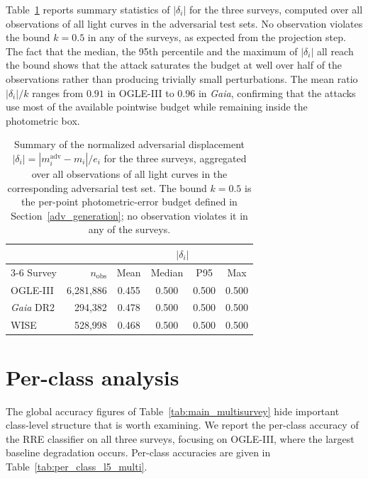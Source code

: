 \documentclass{aa}
\begin{document}
Table~\ref{tab:perturbation_summary} reports summary statistics of
$|\delta_i|$ for the three surveys, computed over all observations of all
light curves in the adversarial test sets. No observation violates the bound
$k = 0.5$ in any of the surveys, as expected from the projection step. The
fact that the median, the 95th percentile and the maximum of $|\delta_i|$
all reach the bound shows that the attack saturates the budget at well over
half of the observations rather than producing trivially small
perturbations. The mean ratio $|\delta_i|/k$ ranges from $0.91$ in
OGLE-III to $0.96$ in \textit{Gaia}, confirming that the attacks use most of
the available pointwise budget while remaining inside the photometric box.

\begin{table}[htbp]
\centering
\caption{Summary of the normalized adversarial displacement
$|\delta_i| = |m^{\mathrm{adv}}_i - m_i|/e_i$ for the three surveys,
aggregated over all observations of all light curves in the corresponding
adversarial test set. The bound $k = 0.5$ is the per-point photometric-error
budget defined in Section~\ref{adv_generation}; no observation violates it
in any of the surveys.}
\label{tab:perturbation_summary}
\setlength{\tabcolsep}{4pt}
\small
\begin{tabular}{lrcccc}
\hline
       &                    & \multicolumn{4}{c}{$|\delta_i|$} \\
\cline{3-6}
Survey & $n_{\mathrm{obs}}$ & Mean & Median & P95 & Max \\
\hline
OGLE-III          &  6{,}281{,}886 & 0.455 & 0.500 & 0.500 & 0.500 \\
\textit{Gaia} DR2 &    294{,}382   & 0.478 & 0.500 & 0.500 & 0.500 \\
WISE              &    528{,}998   & 0.468 & 0.500 & 0.500 & 0.500 \\
\hline
\end{tabular}
\end{table}


\section{Per-class analysis}
\label{app:perclass}
\label{sec:per_class}


The global accuracy figures of Table~\ref{tab:main_multisurvey} hide
important class-level structure that is worth examining. We report the
per-class accuracy of the RRE classifier on all three surveys, focusing
on OGLE-III, where the largest baseline degradation occurs. Per-class
accuracies are given in Table~\ref{tab:per_class_l5_multi}.
\end{document}
